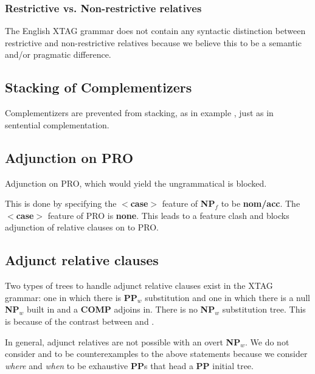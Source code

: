 \begin{\itemize}
\subsubsection{Restrictive vs. Non-restrictive relatives}

The English XTAG grammar does not contain any  syntactic distinction between
restrictive and non-restrictive relatives because we believe this to
be a semantic and/or pragmatic difference.



\subsection{Stacking of Complementizers}

Complementizers are prevented from stacking, as in example , just as
in sentential complementation.


\subsection{Adjunction on PRO}
Adjunction on PRO, which would yield the ungrammatical  is blocked.


This is done by specifying the {\bf $<$case$>$} feature of {\bf NP$_{f}$} to be
{\bf nom/acc}. The {\bf $<$case$>$} feature of PRO is {\bf none}. This
leads to a feature clash and blocks adjunction of relative clauses on to
PRO.

\subsection{Adjunct relative clauses}
\label{sec:adju-RC}
Two types of trees to handle adjunct relative clauses exist in the XTAG
grammar: one in which there is {\bf PP$_{w}$} substitution and one in which
there is a null {\bf NP$_{w}$} built in and a {\bf COMP} adjoins in. There
is no {\bf NP$_{w}$} substitution tree. This is because of the contrast
between  and .  

\enumsentence{the day [[on whose predecessor ] [ Muriel left ]]]}
\enumsentence{*the day [[whose predecessor ] [ Muriel left ]]]}

In general, adjunct relatives are not possible with an overt {\bf
NP$_{w}$}.  We do not consider  and  to be counterexamples
to the above statements because we consider {\em where} and {\em when} to
be exhaustive {\bf PP}s that head a {\bf PP} initial tree.


\end{\itemize}
